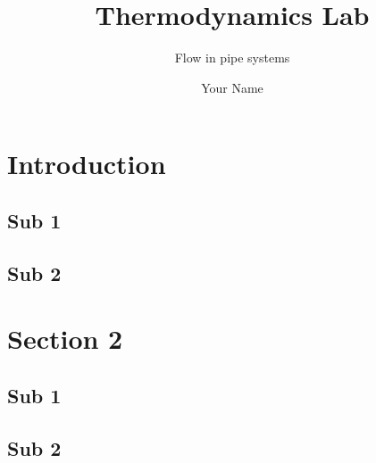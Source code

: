 \documentclass{brookes-assignment}
\author{Your Name}
\title{Thermodynamics Lab}
\subtitle{Flow in pipe systems}
\begin{document}
		
		\maketitle
		
		\section{Introduction}	
			\blindtext
								
			\subsection{Sub 1}
				\blindmathpaper
				\blindenumerate[10]
				\blindtext
				
			\subsection{Sub 2}
				\blindtext
		
		\section{Section 2}	
			\blindtext
								
			\subsection{Sub 1}
				\blindmathpaper
				\blindenumerate[10]
				\blindtext
				
			\subsection{Sub 2}
				\blindtext
		

	
\end{document}
